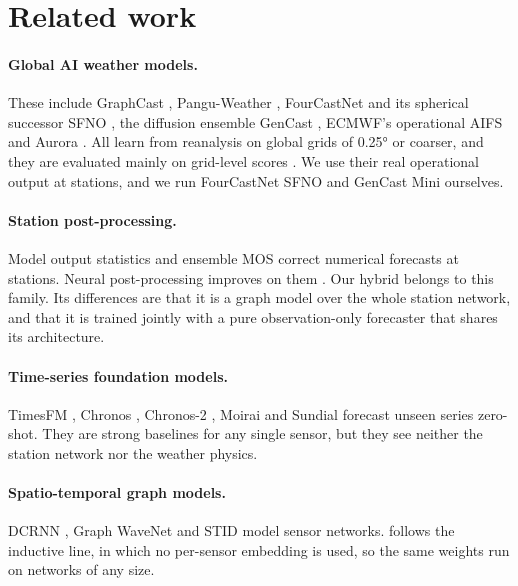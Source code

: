 \section{Related work}

\paragraph{Global AI weather models.}
These include GraphCast \citep{lam2023graphcast}, Pangu-Weather \citep{bi2023pangu}, FourCastNet
\citep{pathak2022fourcastnet} and its spherical successor SFNO \citep{bonev2023sfno}, the diffusion ensemble GenCast
\citep{price2025gencast}, ECMWF's operational AIFS \citep{lang2024aifs} and Aurora \citep{bodnar2025aurora}. All
learn from reanalysis on global grids of 0.25° or coarser, and they are evaluated mainly on grid-level scores
\citep{rasp2024weatherbench2}. We use their real operational output at stations, and we run FourCastNet SFNO and
GenCast Mini ourselves.

\paragraph{Station post-processing.}
Model output statistics \citep{glahn1972mos} and ensemble MOS \citep{gneiting2005emos} correct numerical forecasts
at stations. Neural post-processing improves on them \citep{rasp2018postprocessing}. Our hybrid belongs to this
family. Its differences are that it is a graph model over the whole station network, and that it is trained
jointly with a pure observation-only forecaster that shares its architecture.

\paragraph{Time-series foundation models.}
TimesFM \citep{das2024timesfm}, Chronos \citep{ansari2024chronos}, Chronos-2 \citep{ansari2025chronos2}, Moirai
\citep{woo2024moirai} and Sundial \citep{sundial} forecast unseen series zero-shot. They are strong baselines for
any single sensor, but they see neither the station network nor the weather physics.

\paragraph{Spatio-temporal graph models.}
DCRNN \citep{li2018dcrnn}, Graph WaveNet \citep{wu2019graphwavenet} and STID \citep{shao2022stid} model sensor
networks. \pwm follows the inductive line, in which no per-sensor embedding is used, so the same weights run on
networks of any size.
